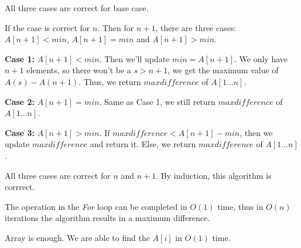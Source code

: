 All three cases are correct for base case.

If the case is correct for $n$. Then for $n+1$, there are three cases: $A[n+1] < min$, $A[n+1] = min$ and $A[n+1] > min$. 

\textbf{Case 1:} $A[n+1] < min$. Then we'll update $min=A[n+1]$. We only have $n+1$ elements, so there won't be a $s>n+1$, we get the maximum value of $A(s)-A(n+1)$. Thus, we return $maxdifference$ of $A[1...n]$.

\textbf{Case 2:} $A[n+1] = min$. Same as Case 1, we still return $maxdifference$ of $A[1...n]$.

\textbf{Case 3:} $A[n+1] > min$. If $maxdifference<A[n+1]-min$, then we update $maxdifference$ and return it. Else, we return $maxdifference$ of $A[1...n]$.

All three cases are correct for $n$ and $n+1$. By induction, this algorithm is corrrect.




The operation in the \textit{For} loop can be completed in $O(1)$ time, thus in $O(n)$ iterations the algorithm results in a maximum difference.


Array is enough. We are able to find the $A[i]$ in $O(1)$ time.




